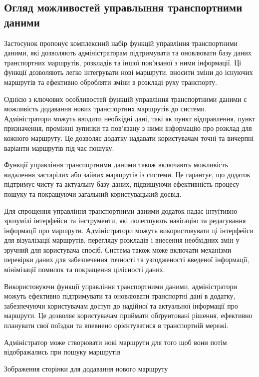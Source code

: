 \subsection{Огляд можливостей управлыння транспортними даними}
\label{subsec:route-management-subsection}

Застосунок пропонує комплексний набір функцій управління транспортними даними, які дозволяють адміністраторам підтримувати та оновлювати базу даних транспортних маршрутів, розкладів та іншої пов'язаної з ними інформації. Ці функції дозволяють легко інтегрувати нові маршрути, вносити зміни до існуючих маршрутів та ефективно обробляти зміни в розкладі руху транспорту.

Однією з ключових особливостей функцій управління транспортними даними є можливість додавання нових транспортних маршрутів до системи. Адміністратори можуть вводити необхідні дані, такі як пункт відправлення, пункт призначення, проміжні зупинки та пов'язану з ними інформацію про розклад для кожного маршруту. Це дозволяє додатку надавати користувачам точні та вичерпні варіанти маршрутів під час пошуку.

Функції управління транспортними даними також включають можливість видалення застарілих або зайвих маршрутів із системи. Це гарантує, що додаток підтримує чисту та актуальну базу даних, підвищуючи ефективність процесу пошуку та покращуючи загальний користувацький досвід.

Для спрощення управління транспортними даними додаток надає інтуїтивно зрозумілі інтерфейси та інструменти, які полегшують навігацію та редагування інформації про маршрути. Адміністратори можуть використовувати ці інтерфейси для візуалізації маршрутів, перегляду розкладів і внесення необхідних змін у зручний для користувача спосіб. Система також може включати механізми перевірки даних для забезпечення точності та узгодженості введеної інформації, мінімізації помилок та покращення цілісності даних.

Використовуючи функції управління транспортними даними, адміністратори можуть ефективно підтримувати та оновлювати транспортні дані в додатку, забезпечуючи користувачам доступ до надійної та актуальної інформації про маршрути. Це дозволяє користувачам приймати обґрунтовані рішення, ефективно планувати свої поїздки та впевнено орієнтуватися в транспортній мережі.

Адміністратор може створювати нові маршрути для того щоб вони потім відображались при пошуку маршрутів

Зображення сторінки для додавання нового маршруту

